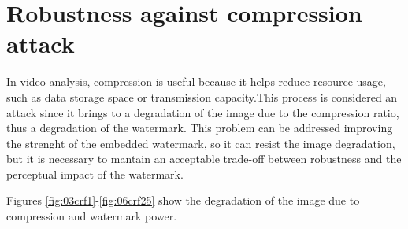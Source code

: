 \section{Robustness against compression attack}

In video analysis, compression is useful because it helps reduce resource usage, such as data storage space or transmission capacity.\newline This process is considered an attack since it brings to a degradation of the image due to the compression ratio, thus a degradation of the watermark.\newline 
This problem can be addressed improving the strenght of the embedded watermark, so it can resist the image degradation, but it is necessary to mantain an acceptable trade-off between robustness and the perceptual impact of the watermark. \newline

Figures \ref{fig:03crf1}-\ref{fig:06crf25} show the degradation of the image due to compression and watermark power.


